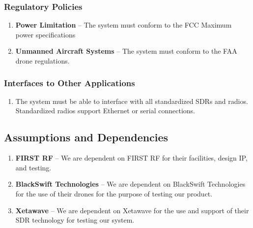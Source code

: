 \documentclass[ProductRequirements.tex]{subfiles}
\begin{document}
		\subsubsection{Regulatory Policies}
			\begin{enumerate}
				\item \textbf{Power Limitation} -- The system must conform to the FCC Maximum power specifications
				\item \textbf{Unmanned Aircraft Systems} -- The system must conform to the FAA drone regulations.
			\end{enumerate}
		\subsubsection{Interfaces to Other Applications}
			\begin{enumerate}
				\item The system must be able to interface with all standardized SDRs and radios.  Standardized radios support Ethernet or serial connections.
				
			\end{enumerate}

		
	\subsection{Assumptions and Dependencies}
		\begin{enumerate}
				\item \textbf{FIRST RF} -- We are dependent on FIRST RF for their facilities, design IP, and testing.  
				\item \textbf{BlackSwift Technologies} -- We are dependent on BlackSwift Technologies for the use of their drones for the purpose of testing our product.  
				\item \textbf{Xetawave} -- We are dependent on Xetawave for the use and support of their SDR technology for testing our system.
		\end{enumerate}
\end{document}

